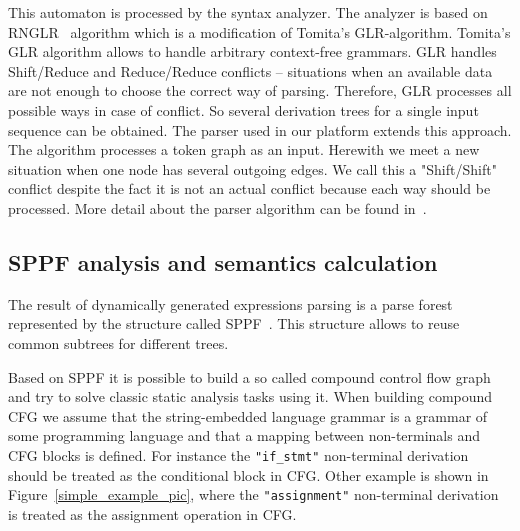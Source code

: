 \documentclass{sig-alternate-05-2015}
\begin{document}
This automaton is processed by the syntax analyzer. The analyzer is based on RNGLR~\cite{RNGLR:ref} algorithm which is a modification of Tomita's GLR-algorithm\cite{Tomita:ref}. Tomita's GLR algorithm allows to handle arbitrary context-free grammars. GLR handles Shift/Reduce and Reduce/Reduce conflicts -- situations when an available data are not enough to choose the correct way of parsing. Therefore, GLR processes all possible ways in case of conflict. So several derivation trees for a single input sequence can be obtained. The parser used in our platform extends this approach. The algorithm processes a token graph as an input. Herewith we meet a new situation when one node has several outgoing edges. We call this a "Shift/Shift" conflict despite the fact it is not an actual conflict because each way should be processed. More detail about the parser algorithm can be found in~\cite{AGLR:ref}. 

\subsection{SPPF analysis and semantics calculation}

The result of dynamically generated expressions parsing is a parse forest represented by the structure called SPPF~\cite{SPPF:ref}. This structure allows to reuse common subtrees for different trees.

Based on SPPF it is possible to build a so called compound control flow graph and try to solve classic static analysis tasks using it. When building compound CFG we assume that the string-embedded language grammar is a grammar of some programming language and that a mapping between non-terminals and CFG blocks is defined. For instance the \verb|"if_stmt"| non-terminal derivation should be treated as the conditional block in CFG. Other example is shown in Figure~\ref{simple_example_pic}, where the \verb|"assignment"| non-terminal derivation is treated as the assignment operation in CFG.
\end{document}
